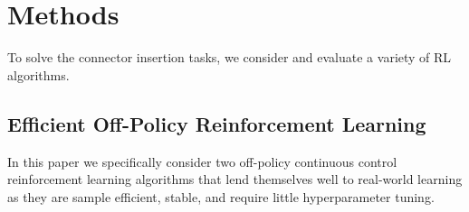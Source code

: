 \section{Methods}\label{sec:method}

To solve the connector insertion tasks, we consider and evaluate a variety of RL algorithms.

\subsection{Efficient Off-Policy Reinforcement Learning}

In this paper we specifically consider two off-policy continuous control reinforcement learning algorithms that lend themselves well to real-world learning as they are sample efficient, stable, and require little hyperparameter tuning.


